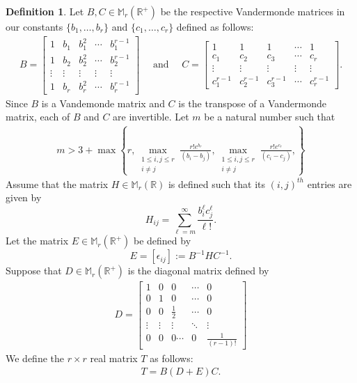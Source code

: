 \documentclass[12pt]{amsart}
\theoremstyle{definition}
\newtheorem{definition}[theorem]{Definition}
\theoremstyle{remark}
\numberwithin{equation}{section}
\begin{document}
\begin{definition}
     \label{def_MatricesBCDE}
Let $B,C\in \mathbb{M}_{r}(\mathbb{R}^+)$ be the respective 
Vandermonde matrices in our constants $\{b_1,\ldots,b_r\}$ and $\{c_1,\ldots,c_r\}$ 
defined as follows:
\begin{align*}
B = \begin{bmatrix}
1 & b_1 & b_1^2 & \cdots & b_1^{r-1}\\
1 & b_2 & b_2^2 & \cdots & b_2^{r-1}\\
\vdots & \vdots & \vdots & \vdots & \vdots \\
1 & b_r & b_r^2 & \cdots & b_r^{r-1}
\end{bmatrix}
\quad \text{ and }\quad 
C= \begin{bmatrix}
1 & 1 & 1& \cdots & 1\\
c_1 & c_2 & c_3 & \cdots & c_r\\
\vdots & \vdots & \vdots & \vdots & \vdots \\
 c_1^{r-1} & c_2^{r-1} & c_3^{r-1} & \cdots & c_r^{r-1}
\end{bmatrix}. 
\end{align*}
Since $B$ is a Vandemonde matrix and $C$ is the transpose of a 
Vandermonde matrix, each of $B$ and $C$ are invertible. 
Let $m$ be a natural number such that 
\begin{align}
\label{eqn_mdef_ineq_v1}
m > 3 + \max\left\{ r ,  \max_{\substack{1\leq i, j \leq r \\ i \neq j}} \frac{r!e^{b_r}}{(b_i-b_j)}, 
     \max_{\substack{1 \leq i, j \leq r \\ i \neq j}}\frac{r!e^{c_r}}{(c_i-c_j)}, \right\}
\end{align}
Assume that the matrix $H\in \mathbb{M}_{r}(\mathbb{R})$ is defined such that its 
$(i,j)^{th}$ entries are given by 
$$H_{ij} = \sum_{\ell=m}^{\infty} \frac{b_i^{\ell}c_j^{\ell}}{\ell!}.$$
Let the matrix $E\in \mathbb{M}_{r}(\mathbb{R}^{+})$ be defined by 
$$E = [\epsilon_{ij}] := B^{-1}HC^{-1}.$$
Suppose that $D\in \mathbb{M}_{r}(\mathbb{R}^{+})$ is the diagonal matrix defined by 
\begin{align*}
D =   \begin{bmatrix}
1 & 0 & 0 & \cdots & 0\\
0 & 1 & 0 & \cdots & 0\\
0 & 0 & \frac{1}{2} & \cdots & 0\\
\vdots & \vdots &\vdots & \ddots & \vdots \\
0 & 0 & 0\cdots & 0& \frac{1}{(r-1)!} 
\end{bmatrix}
\end{align*}
We define the $r \times r$ real matrix $T$ as follows:  
\begin{align*}
T = B (D+E) C.
\end{align*}
\end{definition}
\end{document}
